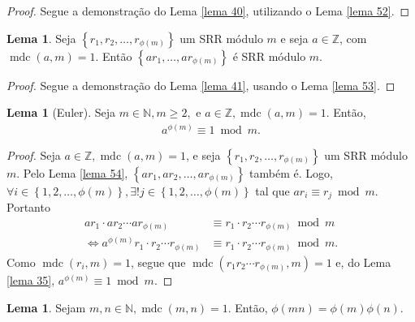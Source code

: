 \documentclass[a4paper,11pt,twoside, leqno]{article}
\DeclareMathOperator{\mdc}{mdc}
\theoremstyle{definition}
\newtheorem{lemma}[theorem]{Lema}
\begin{document}
\begin{proof}
	Segue a demonstração do Lema \eqref{lema 40}, utilizando o Lema \eqref{lema 52}.
\end{proof}
\begin{lemma}
	\label{lema 54}
	Seja $\left\{ r_1, r_2, \dots, r_{\phi(m)} \right\}$ um SRR módulo $m$ e seja $a\in\mathbb{Z}$, com $\mdc(a,m) = 1$. Então $\left\{ ar_1, \dots, ar_{\phi(m)} \right\}$ é SRR módulo $m$.
\end{lemma}
\begin{proof}
	Segue a demonstração do Lema \eqref{lema 41}, usando o Lema \eqref{lema 53}.
\end{proof}
\begin{lemma}[Euler]
	\label{lema de euler}
	Seja $m\in\mathbb{N}, m\geq 2,$ e $a\in\mathbb{Z}, \mdc(a,m) = 1$. Então, 
	\begin{align*}
	a^{\phi(m)} \equiv 1\bmod m.
	\end{align*}
\end{lemma}
\begin{proof}
	Seja $a\in\mathbb{Z}, \mdc(a,m) = 1$, e seja $\left\{ r_1, r_2, \dots, r_{\phi(m)} \right\}$ um SRR módulo $m$. Pelo Lema \eqref{lema 54}, $\left\{ ar_1, ar_2, \dots, ar_{\phi(m)} \right\}$ também é. Logo, $\forall i\in\left\{ 1,2,\dots,\phi(m) \right\}, \exists!j\in\left\{ 1,2,\dots,\phi(m) \right\}$ tal que $ar_i\equiv r_j\bmod m$. Portanto
	\begin{align*}
	ar_1\cdot ar_2\cdots ar_{\phi(m)} &\equiv r_1\cdot r_2\cdots r_{\phi(m)}\bmod m \\
	\Leftrightarrow a^{\phi(m)}r_1\cdot r_2\cdots r_{\phi(m)} &\equiv r_1\cdot r_2\cdots r_{\phi(m)} \bmod m.
	\end{align*}
	Como $\mdc(r_i,m) = 1$, segue que $\mdc(r_1r_2\cdots r_{\phi(m)}, m) = 1$ e, do Lema \eqref{lema 35}, $a^{\phi(m)}\equiv 1\bmod m$.
\end{proof}
\begin{lemma}
	\label{lema 55}
	Sejam $m,n\in\mathbb{N}, \mdc(m,n) = 1$. Então, $\phi(mn) = \phi(m)\phi(n).$
\end{lemma}
\end{document}
